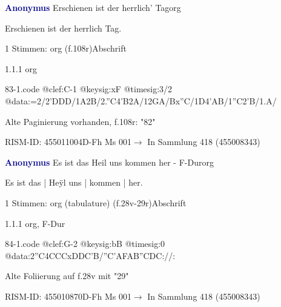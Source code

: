 \documentclass[twocolumn]{book}
\begin{document}
\par \vspace{7pt} \textcolor{darkblue}{\textbf{Anonymus  }}\hfillplus{\textbf{[83]}}\newline Erschienen ist der herrlich' Tag\newline org
\par \begin{itshape}[f.108r, heading:] Erschienen ist der herrlich Tag.\end{itshape} 
\par \textcolor{darkblue}{}  1 Stimmen: org  (f.108r)\newline Abschrift
\par 1.1.1  org  
\begin{filecontents*}{83-1.code}
@clef:C-1
@keysig:xF
@timesig:3/2
@data:=2/2'DDD/1A2B/2.''C4'B2A/12GA/Bx''C/1D4'AB/1''C2'B/1.A/
\end{filecontents*}
\newline
%
\par Alte Paginierung vorhanden, f.108r: "82"
\par RISM-ID: 455011004\newline D-Fh  Ms 001\newline $\rightarrow$ In Sammlung 418 (455008343)
      
\par \vspace{7pt} \textcolor{darkblue}{\textbf{Anonymus  }}\hfillplus{\textbf{[84]}}\newline Es ist das Heil uns kommen her - F-Dur\newline org
\par \begin{itshape}[f.28v, at left:] Es ist das | Heÿl uns | kommen | her.\end{itshape} 
\par \textcolor{darkblue}{}  1 Stimmen: org (tabulature)  (f.28v-29r)\newline Abschrift
\par 1.1.1  org, F-Dur  
\begin{filecontents*}{84-1.code}
@clef:G-2
@keysig:bB
@timesig:0
@data:2''C4CCCxDDC'B/''C'AFAB''CDC://:
\end{filecontents*}
\newline
%
\par Alte Foliierung auf f.28v mit "29"
\par RISM-ID: 455010870\newline D-Fh  Ms 001\newline $\rightarrow$ In Sammlung 418 (455008343)
      
\end{document}
